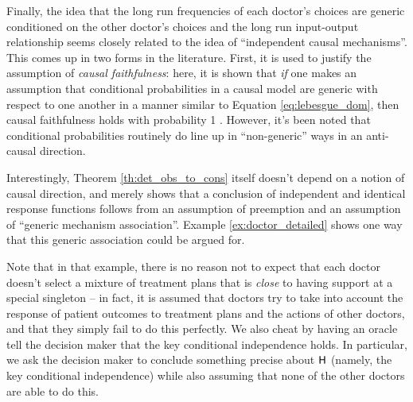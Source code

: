 Finally, the idea that the long run frequencies of each doctor's choices are generic conditioned on the other doctor's choices and the long run input-output relationship seems closely related to the idea of ``independent causal mechanisms''. This comes up in two forms in the literature. First, it is used to justify the assumption of \emph{causal faithfulness}: here, it is shown that \emph{if} one makes an assumption that conditional probabilities in a causal model are generic with respect to one another in a manner similar to Equation \eqref{eq:lebesgue_dom}, then causal faithfulness holds with probability 1 \citep{meek_strong_1995}. However, it's been noted that conditional probabilities routinely do line up in ``non-generic'' ways in an anti-causal direction.

Interestingly, Theorem \ref{th:det_obs_to_cons} itself doesn't depend on a notion of causal direction, and merely shows that a conclusion of independent and identical response functions follows from an assumption of preemption and an assumption of ``generic mechanism association''. Example \ref{ex:doctor_detailed} shows one way that this generic association could be argued for. 

Note that in that example, there is no reason not to expect that each doctor doesn't select a mixture of treatment plans that is \emph{close} to having support at a special singleton -- in fact, it is assumed that doctors try to take into account the response of patient outcomes to treatment plans and the actions of other doctors, and that they simply fail to do this perfectly. We also cheat by having an oracle tell the decision maker that the key conditional independence holds. In particular, we ask the decision maker to conclude something precise about $\mathsf{H}$ (namely, the key conditional independence) while also assuming that none of the other doctors are able to do this. 


